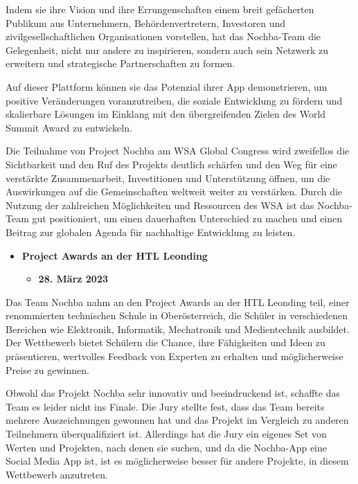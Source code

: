Indem sie ihre Vision und ihre Errungenschaften einem breit gefächerten Publikum aus Unternehmern, Behördenvertretern, Investoren und zivilgesellschaftlichen Organisationen vorstellen, hat das Nochba-Team die Gelegenheit, nicht nur andere zu inspirieren, sondern auch sein Netzwerk zu erweitern und strategische Partnerschaften zu formen.

Auf dieser Plattform können sie das Potenzial ihrer App demonstrieren, um positive Veränderungen voranzutreiben, die soziale Entwicklung zu fördern und skalierbare Lösungen im Einklang mit den übergreifenden Zielen des World Summit Award zu entwickeln.

Die Teilnahme von Project Nochba am WSA Global Congress wird zweifellos die Sichtbarkeit und den Ruf des Projekts deutlich schärfen und den Weg für eine verstärkte Zusammenarbeit, Investitionen und Unterstützung öffnen, um die Auswirkungen auf die Gemeinschaften weltweit weiter zu verstärken. Durch die Nutzung der zahlreichen Möglichkeiten und Ressourcen des WSA ist das Nochba-Team gut positioniert, um einen dauerhaften Unterschied zu machen und einen Beitrag zur globalen Agenda für nachhaltige Entwicklung zu leisten.

\begin{itemize}
    \item \textbf{Project Awards an der HTL Leonding}
          \begin{itemize}
              \item \textbf{28. März 2023}
          \end{itemize}
\end{itemize}

Das Team Nochba nahm an den Project Awards an der HTL Leonding teil, einer renommierten technischen Schule in Oberösterreich, die Schüler in verschiedenen Bereichen wie Elektronik, Informatik, Mechatronik und Medientechnik ausbildet. Der Wettbewerb bietet Schülern die Chance, ihre Fähigkeiten und Ideen zu präsentieren, wertvolles Feedback von Experten zu erhalten und möglicherweise Preise zu gewinnen.

Obwohl das Projekt Nochba sehr innovativ und beeindruckend ist, schaffte das Team es leider nicht ins Finale. Die Jury stellte fest, dass das Team bereits mehrere Auszeichnungen gewonnen hat und das Projekt im Vergleich zu anderen Teilnehmern überqualifiziert ist. Allerdings hat die Jury ein eigenes Set von Werten und Projekten, nach denen sie suchen, und da die Nochba-App eine Social Media App ist, ist es möglicherweise besser für andere Projekte, in diesem Wettbewerb anzutreten.

